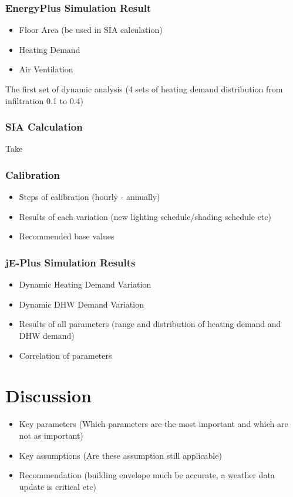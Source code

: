 \documentclass[11pt, a4paper]{article}
\theoremstyle{definition}
\begin{document}
		\subsubsection{EnergyPlus Simulation Result}		
		\begin{itemize}
			\item Floor Area (be used in SIA calculation)
			\item Heating Demand
			\item Air Ventilation
		\end{itemize}
		The first set of dynamic analysis (4 sets of heating demand distribution from infiltration 0.1 to 0.4)

		\subsubsection{SIA Calculation}
			Take
		\subsubsection{Calibration}
			\begin{itemize}
				\item Steps of calibration (hourly - annually)
				\item Results of each variation (new lighting schedule/shading schedule etc)
				\item Recommended base values
			\end{itemize}
			
		\subsubsection{jE-Plus Simulation Results}
			\begin{itemize}
				\item Dynamic Heating Demand Variation
				\item Dynamic DHW Demand Variation
				\item Results of all parameters (range and distribution of heating demand and DHW demand)
				\item Correlation of parameters
			\end{itemize}



\section{Discussion}

	\begin{itemize}
		\item Key parameters (Which parameters are the most important and which are not as important)
		\item Key assumptions (Are these assumption still applicable)
		\item Recommendation (building envelope much be accurate, a weather data update is critical etc)
	\end{itemize}
			
\end{document}
